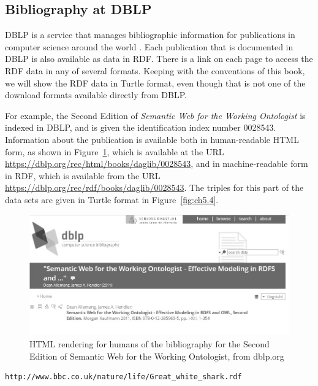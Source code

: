 \subsection{Bibliography at DBLP}

DBLP is a service that manages bibliographic information for publications
in computer science around the world \cite{DBLP:conf/spire/Ley02}.  Each 
publication that is documented in DBLP is also available as data in RDF. 
There is a link on each page to access the RDF data in any of several 
formats.  Keeping with the conventions of this book, we will show the
RDF data in Turtle format, even though that is not one of the download formats 
available directly from DBLP. 

For example, the Second Edition of \emph{Semantic Web for the Working Ontologist} is 
indexed in DBLP, and is given the identification index number 0028543.  Information about
the publication is available both in human-readable HTML form, as shown in Figure~\ref{fig:ch5.3}, 
which is available at the URL \url{https://dblp.org/rec/html/books/daglib/0028543}, and in machine-readable form
in RDF, which is available from the URL \url{https://dblp.org/rec/rdf/books/daglib/0028543}. 
The triples for this part of the data sets are given in Turtle format in Figure~\ref{fig:ch5.4}.


\begin{figure}
    \centering
     \includegraphics[width=5.0in]{media/ch5/figure-05-03.jpg}
    \caption{HTML rendering for humans of the bibliography for the Second Edition of Semantic Web for the Working Ontologist, from dblp.org}
    \label{fig:ch5.3}
\end{figure}





\begin{lstlisting}
http://www.bbc.co.uk/nature/life/Great_white_shark.rdf
\end{lstlisting}

